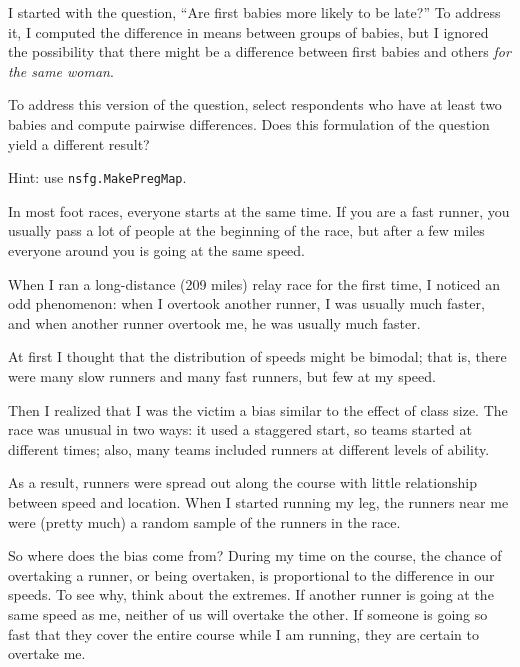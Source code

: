 \documentclass[12pt]{book}
\begin{document}
\begin{exercise}
I started with the question, ``Are first babies more likely
to be late?''  To address it, I computed the difference in
means between groups of babies, but I ignored the possibility
that there might be a difference between first babies and
others {\em for the same woman}.

To address this version of the question, select respondents who
have at least two babies and compute pairwise differences.  Does
this formulation of the question yield a different result?

Hint: use {\tt nsfg.MakePregMap}.
\end{exercise}


\begin{exercise}
\label{relay}

In most foot races, everyone starts at the same time.  If you are a
fast runner, you usually pass a lot of people at the beginning of the
race, but after a few miles everyone around you is going at the same
speed.

When I ran a long-distance (209 miles) relay race for the first
time, I noticed an odd phenomenon: when I overtook another runner, I
was usually much faster, and when another runner overtook me, he was
usually much faster.

At first I thought that the distribution of speeds might be bimodal;
that is, there were many slow runners and many fast runners, but few
at my speed.

Then I realized that I was the victim a bias similar to the
effect of class size.  The race
was unusual in two ways: it used a staggered start, so teams started
at different times; also, many teams included runners at different
levels of ability.  

As a result, runners were spread out along the course with little
relationship between speed and location.  When I started running my
leg, the runners near me were (pretty much) a random sample of the
runners in the race.

So where does the bias come from?  During my time on the course, the
chance of overtaking a runner, or being overtaken, is proportional to
the difference in our speeds.  To see why, think about the extremes.
If another runner is going at the same speed as me, neither of us will
overtake the other.  If someone is going so fast that they cover the
entire course while I am running, they are certain to overtake me.


\end{exercise}
\end{document}
